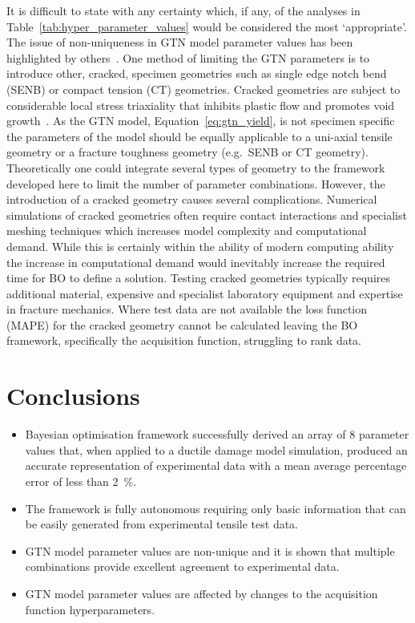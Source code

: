 \documentclass[preprint, review, 12pt]{elsarticle}
\begin{document}
	It is difficult to state with any certainty which, if any, of the analyses in Table~\ref{tab:hyper_parameter_values} would be considered the most `appropriate'.
	The issue of non-uniqueness in GTN model parameter values has been highlighted by others~\cite{KIRAN2014, CHAHBOUB2019}.
	One method of limiting the GTN parameters is to introduce other, cracked, specimen geometries such as single edge notch bend (SENB) or compact tension (CT) geometries.
	Cracked geometries are subject to considerable local stress triaxiality that inhibits plastic flow and promotes void growth~\cite{BROCKS1995}.
	As the GTN model, Equation~\ref{eq:gtn_yield}, is not specimen specific the parameters of the model should be equally applicable to a uni-axial tensile geometry or a fracture toughness geometry (e.g.\ SENB or CT geometry).
	Theoretically one could integrate several types of geometry to the framework developed here to limit the number of parameter combinations.
	However, the introduction of a cracked geometry causes several complications.
	Numerical simulations of cracked geometries often require contact interactions and specialist meshing techniques which increases model complexity and computational demand.
	While this is certainly within the ability of modern computing ability the increase in computational demand would inevitably increase the required time for BO to define a solution.
	Testing cracked geometries typically requires additional material, expensive and specialist laboratory equipment and expertise in fracture mechanics.
	Where test data are not available the loss function (MAPE) for the cracked geometry cannot be calculated leaving the BO framework, specifically the acquisition function, struggling to rank data.

	\section{Conclusions}
	\label{h:conclusions}

	\begin{itemize}
		\item Bayesian optimisation framework successfully derived an array of 8 parameter values that, when applied to a ductile damage model simulation, produced an accurate representation of experimental data with a mean average percentage error of less than 2~\%.
		\item The framework is fully autonomous requiring only basic information that can be easily generated from experimental tensile test data.
		\item GTN model parameter values are non-unique and it is shown that multiple combinations provide excellent agreement to experimental data.
		\item GTN model parameter values are affected by changes to the acquisition function hyperparameters.
	\end{itemize}
\end{document}

